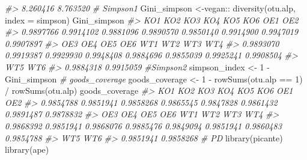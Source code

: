 \documentclass[
]{article}
\newenvironment{Shaded}{\begin{snugshade}}{\end{snugshade}}
\newcommand{\AttributeTok}[1]{\textcolor[rgb]{0.77,0.63,0.00}{#1}}
\newcommand{\CommentTok}[1]{\textcolor[rgb]{0.56,0.35,0.01}{\textit{#1}}}
\newcommand{\DecValTok}[1]{\textcolor[rgb]{0.00,0.00,0.81}{#1}}
\newcommand{\FunctionTok}[1]{\textcolor[rgb]{0.00,0.00,0.00}{#1}}
\newcommand{\NormalTok}[1]{#1}
\newcommand{\OtherTok}[1]{\textcolor[rgb]{0.56,0.35,0.01}{#1}}
\newcommand{\SpecialCharTok}[1]{\textcolor[rgb]{0.00,0.00,0.00}{#1}}
\newcommand{\StringTok}[1]{\textcolor[rgb]{0.31,0.60,0.02}{#1}}
\begin{document}
\begin{Shaded}
\begin{Highlighting}[]
\CommentTok{\#\textgreater{} 8.260416 8.763520}
\CommentTok{\# Simpson1}
\NormalTok{Gini\_simpson  }\OtherTok{\textless{}{-}}\NormalTok{vegan}\SpecialCharTok{::} \FunctionTok{diversity}\NormalTok{(otu.alp, }\AttributeTok{index =} \StringTok{\textquotesingle{}simpson\textquotesingle{}}\NormalTok{)}
\NormalTok{Gini\_simpson}
\CommentTok{\#\textgreater{}       KO1       KO2       KO3       KO4       KO5       KO6       OE1       OE2 }
\CommentTok{\#\textgreater{} 0.9897766 0.9914102 0.9881096 0.9890570 0.9850140 0.9914900 0.9947019 0.9907897 }
\CommentTok{\#\textgreater{}       OE3       OE4       OE5       OE6       WT1       WT2       WT3       WT4 }
\CommentTok{\#\textgreater{} 0.9893070 0.9919387 0.9929930 0.9948408 0.9884696 0.9855039 0.9925241 0.9908504 }
\CommentTok{\#\textgreater{}       WT5       WT6 }
\CommentTok{\#\textgreater{} 0.9884318 0.9915059}
\CommentTok{\#Simpson2}
\NormalTok{simpson\_index }\OtherTok{\textless{}{-}} \DecValTok{1} \SpecialCharTok{{-}}\NormalTok{ Gini\_simpson}
\CommentTok{\# goods\_coverage}
\NormalTok{goods\_coverage }\OtherTok{\textless{}{-}} \DecValTok{1} \SpecialCharTok{{-}} \FunctionTok{rowSums}\NormalTok{(otu.alp }\SpecialCharTok{==} \DecValTok{1}\NormalTok{) }\SpecialCharTok{/} \FunctionTok{rowSums}\NormalTok{(otu.alp)}
\NormalTok{goods\_coverage}
\CommentTok{\#\textgreater{}       KO1       KO2       KO3       KO4       KO5       KO6       OE1       OE2 }
\CommentTok{\#\textgreater{} 0.9854788 0.9851941 0.9858268 0.9865545 0.9847828 0.9861432 0.9891487 0.9878832 }
\CommentTok{\#\textgreater{}       OE3       OE4       OE5       OE6       WT1       WT2       WT3       WT4 }
\CommentTok{\#\textgreater{} 0.9868392 0.9851941 0.9868076 0.9885476 0.9849094 0.9851941 0.9860483 0.9854788 }
\CommentTok{\#\textgreater{}       WT5       WT6 }
\CommentTok{\#\textgreater{} 0.9851941 0.9858268}
\CommentTok{\# PD}
\FunctionTok{library}\NormalTok{(picante)}
\FunctionTok{library}\NormalTok{(ape)}


\end{Highlighting}
\end{Shaded}
\end{document}

